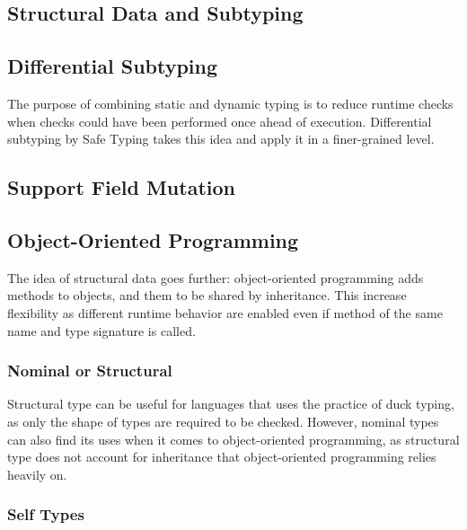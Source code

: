 
\subsection{Structural Data and Subtyping}

\subsection{Differential Subtyping}

The purpose of combining static and dynamic typing is to reduce
runtime checks when checks could have been performed once ahead of execution.
Differential subtyping by Safe Typing takes this idea and apply it in a finer-grained level.

\subsection{Support Field Mutation}



\subsection{Object-Oriented Programming}

The idea of structural data goes further: object-oriented programming adds methods to objects,
and them to be shared by inheritance.
This increase flexibility as different runtime behavior are enabled even if method of the same name and type signature is called.

\subsubsection{Nominal or Structural}

Structural type can be useful for languages that uses the practice of duck typing, as only the shape of types are required to be checked.
However, nominal types can also find its uses when it comes to object-oriented programming,
as structural type does not account for inheritance that object-oriented programming relies heavily on.

\subsubsection{Self Types}

